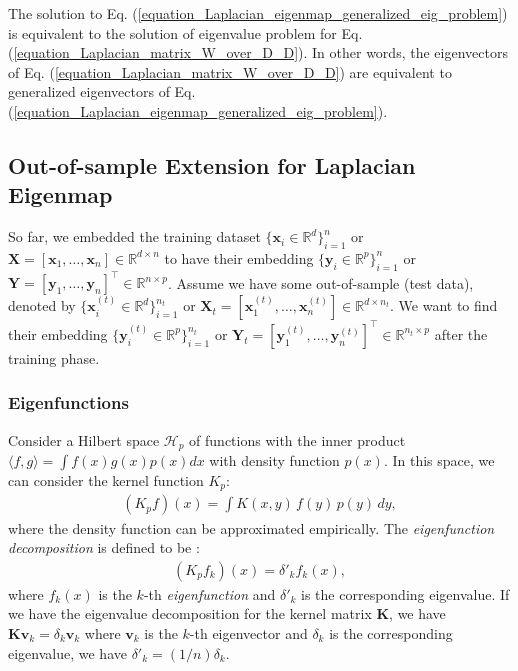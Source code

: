 \documentclass[lang=cn,10pt]{gorgeousnbook}
\numberwithin{equation}{section}%
\numberwithin{figure}{section}%
\begin{document}
The solution to Eq. (\ref{equation_Laplacian_eigenmap_generalized_eig_problem}) is equivalent to the solution of eigenvalue problem for Eq. (\ref{equation_Laplacian_matrix_W_over_D_D}). In other words, the eigenvectors of Eq. (\ref{equation_Laplacian_matrix_W_over_D_D}) are equivalent to generalized eigenvectors of Eq. (\ref{equation_Laplacian_eigenmap_generalized_eig_problem}).

\subsection{Out-of-sample Extension for Laplacian Eigenmap}

So far, we embedded the training dataset $\{\boldsymbol{x}_i \in \mathbb{R}^d\}_{i=1}^n$ or $\boldsymbol{X} = [\boldsymbol{x}_1, \dots, \boldsymbol{x}_n] \in \mathbb{R}^{d \times n}$ to have their embedding $\{\boldsymbol{y}_i \in \mathbb{R}^p\}_{i=1}^n$ or $\boldsymbol{Y} = [\boldsymbol{y}_1, \dots, \boldsymbol{y}_n]^\top \in \mathbb{R}^{n \times p}$.
Assume we have some out-of-sample (test data), denoted by $\{\boldsymbol{x}_i^{(t)} \in \mathbb{R}^d\}_{i=1}^{n_t}$ or $\boldsymbol{X}_t = [\boldsymbol{x}_1^{(t)}, \dots, \boldsymbol{x}_n^{(t)}] \in \mathbb{R}^{d \times n_t}$. We want to find their embedding $\{\boldsymbol{y}_i^{(t)} \in \mathbb{R}^p\}_{i=1}^{n_t}$ or $\boldsymbol{Y}_t = [\boldsymbol{y}_1^{(t)}, \dots, \boldsymbol{y}_n^{(t)}]^\top \in \mathbb{R}^{n_t \times p}$ after the training phase. 

\subsubsection{Eigenfunctions}

Consider a Hilbert space $\mathcal{H}_p$ of functions with the inner product $\langle f,g \rangle = \int f(x) g(x) p(x) dx$ with density function $p(x)$. In this space, we can consider the kernel function $K_p$:
\begin{align}
(K_p f)(x) = \int K(x,y)\, f(y)\, p(y)\, dy,
\end{align}
where the density function can be approximated empirically. 
The \textit{eigenfunction decomposition} is defined to be \cite{bengio2004learning,bengio2004out}:
\begin{align}
(K_p f_k)(x) = \delta'_k f_k(x),
\end{align}
where $f_k(x)$ is the $k$-th \textit{eigenfunction} and $\delta'_k$ is the corresponding eigenvalue.
If we have the eigenvalue decomposition \cite{ghojogh2019eigenvalue} for the kernel matrix $\boldsymbol{K}$, we have $\boldsymbol{K} \boldsymbol{v}_k = \delta_k \boldsymbol{v}_k$ where $\boldsymbol{v}_k$ is the $k$-th eigenvector and $\delta_k$ is the corresponding eigenvalue, we have $\delta'_k = (1/n) \delta_k$. 
\end{document}
